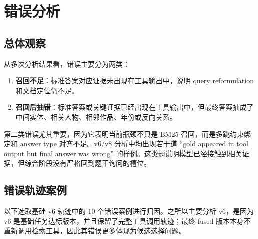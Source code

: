 \documentclass[a4paper]{article}
\begin{document}
\section{错误分析}

\subsection{总体观察}

从多次分析结果看，错误主要分为两类：

\begin{enumerate}
  \item \textbf{召回不足}：标准答案对应证据未出现在工具输出中，说明 query reformulation 和文档定位仍不足。
  \item \textbf{召回后抽错}：标准答案或关键证据已经出现在工具输出中，但最终答案抽成了中间实体、相关人物、相邻作品、年份或反向关系。
\end{enumerate}

第二类错误尤其重要，因为它表明当前瓶颈不只是 BM25 召回，而是多跳约束绑定和 answer type 对齐不足。v6/v8 分析中均出现若干道 ``gold appeared in tool output but final answer was wrong'' 的样例。这类题说明模型已经接触到相关证据，但综合阶段没有严格回到题干询问的槽位。

\subsection{错误轨迹案例}

以下选取基础 v6 轨迹中的 10 个错误案例进行归因。之所以主要分析 v6，是因为 v6 是基础任务达标版本，并且保留了完整工具调用轨迹；最终 fused 版本本身不重新调用检索工具，因此其错误更多体现为候选选择问题。
\end{document}
